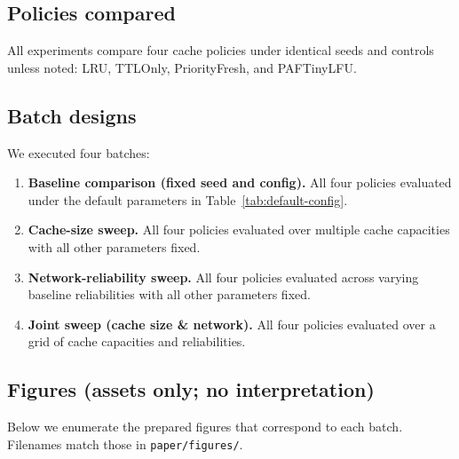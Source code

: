 \documentclass[11pt,twocolumn]{article}
\begin{document}
\subsection{Policies compared}
All experiments compare four cache policies under identical seeds and controls unless noted: LRU, TTLOnly, PriorityFresh, and PAFTinyLFU.

\subsection{Batch designs}
We executed four batches:
\begin{enumerate}
        \item \textbf{Baseline comparison (fixed seed and config).} All four policies evaluated under the default parameters in Table~\ref{tab:default-config}.
        \item \textbf{Cache-size sweep.} All four policies evaluated over multiple cache capacities with all other parameters fixed.
        \item \textbf{Network-reliability sweep.} All four policies evaluated across varying baseline reliabilities with all other parameters fixed.
        \item \textbf{Joint sweep (cache size \& network).} All four policies evaluated over a grid of cache capacities and reliabilities.
\end{enumerate}

\subsection{Figures (assets only; no interpretation)}
Below we enumerate the prepared figures that correspond to each batch. Filenames match those in \texttt{paper/figures/}.
\end{document}
